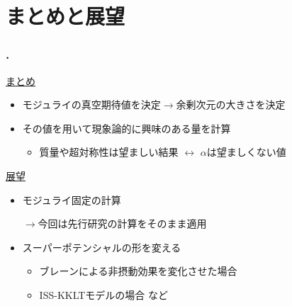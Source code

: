 \documentclass[
  a4paper,uplatex,dvipdfmx,11pt,
  xcolor = {dvipsnames,svgnames},
  hyperref ={colorlinks=true,citecolor=Navy,linkcolor=NavyBlue,urlcolor=purple}
]{beamer}
\renewcommand{\theequation}{\thesection.\arabic{equation}}
\renewcommand{\thefigure}{\thesection.\arabic{figure}}
\begin{document}

\section{まとめと展望}

\begin{frame}
  \frametitle{\thesection.\ \secname}

  \uline{まとめ}
  \begin{itemize}
    \item 
    モジュライの真空期待値を決定$\rightarrow$余剰次元の大きさを決定
    \item 
    その値を用いて現象論的に興味のある量を計算
    \begin{itemize}
      \item 
      質量や超対称性は望ましい結果
      $\leftrightarrow$
      $\alpha$は望ましくない値
    \end{itemize}
  \end{itemize}

  \uline{展望}
  \begin{itemize}
    \item 
    モジュライ固定の計算

    \vspace*{-10pt}

    \begin{flushright}
      $\longrightarrow$今回は先行研究の計算をそのまま適用
    \end{flushright}
    \item 
    スーパーポテンシャルの形を変える
    \begin{itemize}
      \item 
      ブレーンによる非摂動効果を変化させた場合
      \item 
      ISS-KKLTモデルの場合
      \hspace*{4cm}
      など
    \end{itemize}
  \end{itemize}

\end{frame}


\setcounter{Appendix}{\value{framenumber}}
\setcounter{section}{0}
\renewcommand{\thesubsection}{\Alph{subsection}}
\makeatletter
   \renewcommand{\theequation}{\thesubsection.\arabic{equation}}
   
   \renewcommand{\thefigure}{\thesubsection.\arabic{figure}}
   
\end{document}
